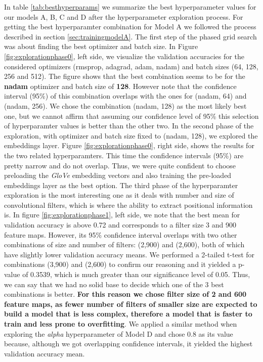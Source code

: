 \documentclass[10pt,journal,compsoc, onecolumn]{IEEEtran}
\begin{document}
In table \ref{tab:besthyperparams} we summarize the best hyperparameter values for our models A, B, C and D after the hyperparameter exploration process. For getting the best hyperparamter combination for Model A we followed the process described in section \ref{sec:trainingmodelA}. The first step of the phased grid search was about finding the best optimizer and batch size. In Figure \ref{fig:explorationphase0}, left side, we visualize the validation accuracies for the considered optimizers (rmsprop, adagrad, adam, nadam) and batch sizes (64, 128, 256 and 512). The figure shows that the best combination seems to be for the \textbf{nadam} optimizer and batch size of \textbf{128}. However note that the confidence interval (95\%) of this combination overlaps with the ones for (nadam, 64) and (nadam, 256). We chose the combination (nadam, 128) as the most likely best one, but we cannot affirm that assuming our confidence level of 95\% this selection of hyperparamter values is better than the other two. In the second phase of the exploration, with optimizer and batch size fixed to (nadam, 128), we explored the embeddings layer. Figure \ref{fig:explorationphase0}, right side, shows the results for the two related hyperparamters. This time the confidence intervals (95\%) are pretty narrow and do not overlap. Thus, we were quite confident to choose preloading the \textit{GloVe} embedding vectors and also training the pre-loaded embeddings layer as the best option. 
The third phase of the hyperparamter exploration is the most interesting one as it deals with number and size of convolutional filters, which is where the ability to extract positional information is. In figure \ref{fig:explorationphase1}, left side, we note that the best mean for validation accuracy is above 0.72 and corresponds to a filter size 3 and 900 feature maps. However, its 95\% confidence interval overlaps with two other combinations of size and number of filters: (2,900) and (2,600), both of which have slightly lower validation accuracy means. We performed a 2-tailed t-test for combinations (3,900) and (2,600) to confirm our reasoning and it yielded a p-value of 0.3539, which is much greater than our significance level of 0.05. Thus, we can say that we had no solid base to decide which one of the 3 best combinations is better. \textbf{For this reason we chose filter size of 2 and 600 feature maps, as fewer number of filters of smaller size are expected to build a model that is less complex, therefore a model that is faster to train and less prone to overfitting}.
We applied a similar method when exploring the \textit{alpha} hyperparameter of Model D and chose 0.8 as its value because, although we got overlapping confidence intervals, it yielded the highest validation accuracy mean.
\end{document}
